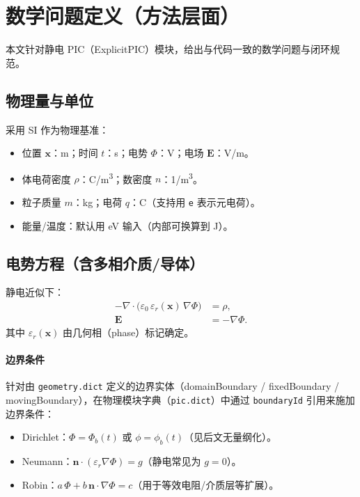 \documentclass[11pt,a4paper]{ctexart}
\begin{document}
\section{数学问题定义（方法层面）}
本文针对静电 PIC（ExplicitPIC）模块，给出与代码一致的数学问题与闭环规范。

\subsection{物理量与单位}
采用 SI 作为物理基准：
\begin{itemize}[leftmargin=2em]
  \item 位置 $\bm{x}$：\si{m}；时间 $t$：\si{s}；电势 $\Phi$：\si{V}；电场 $\bm{E}$：\si{V/m}。
  \item 体电荷密度 $\rho$：\si{C/m^3}；数密度 $n$：\si{1/m^3}。
  \item 粒子质量 $m$：\si{kg}；电荷 $q$：\si{C}（支持用 \texttt{e} 表示元电荷）。
  \item 能量/温度：默认用 \si{eV} 输入（内部可换算到 \si{J}）。
\end{itemize}

\subsection{电势方程（含多相介质/导体）}
静电近似下：
\begin{align}
-\nabla\cdot\bigl(\varepsilon_0\,\varepsilon_r(\bm{x})\,\nabla\Phi\bigr) &= \rho,\\
\bm{E} &= -\nabla\Phi.
\end{align}
其中 $\varepsilon_r(\bm{x})$ 由几何相（phase）标记确定。

\paragraph{边界条件}
针对由 \texttt{geometry.dict} 定义的边界实体（domainBoundary / fixedBoundary / movingBoundary），在物理模块字典（\texttt{pic.dict}）中通过 \texttt{boundaryId} 引用来施加边界条件：
\begin{itemize}[leftmargin=2em]
  \item Dirichlet：$\Phi=\Phi_b(t)$ 或 $\phi=\phi_b(t)$（见后文无量纲化）。
  \item Neumann：$\bm{n}\cdot(\varepsilon_r\nabla\Phi)=g$（静电常见为 $g=0$）。
  \item Robin：$a\,\Phi+b\,\bm{n}\cdot\nabla\Phi=c$（用于等效电阻/介质层等扩展）。
\end{itemize}
\end{document}

